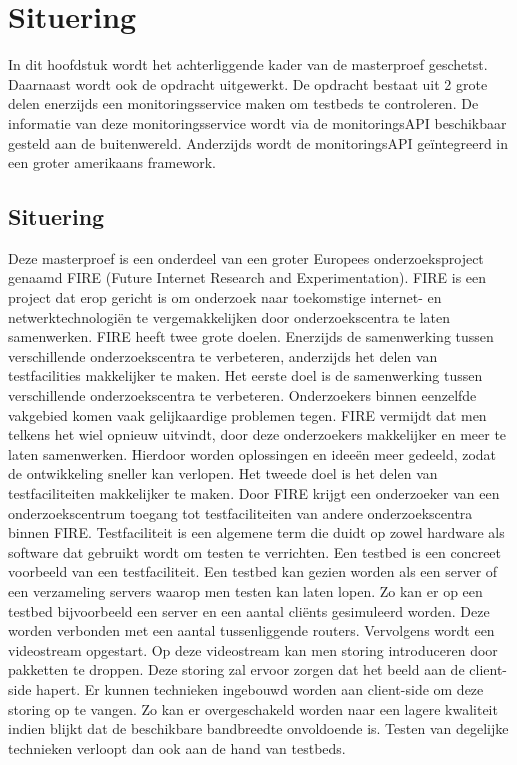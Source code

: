 \chapter{Situering}
{\samenvatting
In dit hoofdstuk wordt het achterliggende kader van de masterproef geschetst. Daarnaast wordt ook de opdracht uitgewerkt. De opdracht bestaat uit 2 grote delen enerzijds een monitoringsservice maken om testbeds te controleren. De informatie van deze monitoringsservice wordt via de monitoringsAPI beschikbaar gesteld aan de buitenwereld. Anderzijds wordt de monitoringsAPI geïntegreerd in een groter amerikaans framework.}
\section{Situering}
\npar
Deze masterproef is een onderdeel van een groter Europees onderzoeksproject genaamd FIRE (Future Internet Research and Experimentation). FIRE is een project dat erop gericht is om onderzoek naar toekomstige internet- en netwerktechnologiën te vergemakkelijken door onderzoekscentra te laten samenwerken\citep{Fire-what-is}. FIRE heeft twee grote doelen. Enerzijds de samenwerking tussen verschillende onderzoekscentra te verbeteren, anderzijds het delen van testfacilities makkelijker te maken.
\npar
Het eerste doel is de samenwerking tussen verschillende onderzoekscentra te verbeteren. Onderzoekers binnen eenzelfde vakgebied komen vaak gelijkaardige problemen tegen. FIRE vermijdt dat men telkens het wiel opnieuw uitvindt, door deze onderzoekers makkelijker en meer te laten samenwerken. Hierdoor worden oplossingen en ideeën meer gedeeld, zodat de ontwikkeling sneller kan verlopen.
\npar
Het tweede doel is het delen van testfaciliteiten makkelijker te maken. Door FIRE krijgt een onderzoeker van een onderzoekscentrum toegang tot testfaciliteiten van andere onderzoekscentra binnen FIRE. Testfaciliteit is een algemene term die duidt op zowel hardware als software dat gebruikt wordt om testen te verrichten. Een testbed is een concreet voorbeeld van een testfaciliteit. Een testbed kan gezien worden als een server of een verzameling servers waarop men testen kan laten lopen. Zo kan er op een testbed bijvoorbeeld een server en een aantal cli\"ents gesimuleerd worden. Deze worden verbonden met een aantal tussenliggende routers. Vervolgens wordt een videostream opgestart. Op deze videostream kan men storing introduceren door pakketten te droppen. Deze storing zal ervoor zorgen dat het beeld aan de client-side hapert. Er kunnen technieken ingebouwd worden aan client-side om deze storing op te vangen. Zo kan er overgeschakeld worden naar een lagere kwaliteit indien blijkt dat de beschikbare bandbreedte onvoldoende is. Testen van degelijke technieken verloopt dan ook aan de hand van testbeds.
